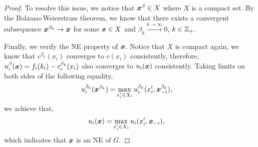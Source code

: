 \begin{proof}
To resolve this issue, we notice that ${\bm{x}}^\beta \in X$ where $X$ is a compact set. By the Bolzano-Weierstrass theorem, we know that there exists a convergent subsequence ${\bm{x}}^{\beta_k} \to {\bm{x}}$ for some ${\bm{x}} \in X$ and  $ \beta_k \overset{k \to \infty}{\longrightarrow} 0$, $k\in\mathbb{Z}_+$.

Finally, we verify the NE property of ${\bm{x}}$. Notice that $X$ is compact again, we know that $c^{\beta_k}(x_i)$ converges to $c(x_i)$ consistently, therefore, $u^\beta_i({\bm{x}}) = f_i(k_i) - c^{\beta_k}_i(x_i)$ also converges to $u_i({\bm{x}})$ consistently. Taking limits on both sides of the following equality,
\begin{align*}
    u^{\beta_k}_i({\bm{x}}^{\beta_k}) =& \max_{x'_i\in X_i} u^{\beta_k}_i(x'_i,{\bm{x}}^{\beta_k}_{-i}),
\end{align*}
we achieve that, 
\begin{align*}
    u_i({\bm{x}}) =& \max_{x'_i\in X_i} u_i(x'_i,{\bm{x}}_{-i}),
\end{align*}
which indicates that ${\bm{x}}$ is an NE of $G$.

\end{proof}
